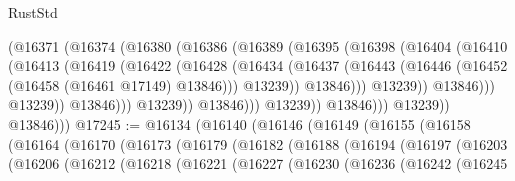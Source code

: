 \begin{lexlean}{RustStd}
\begin{coremodule}
                                (@16371
                                  (@16374
                                    (@16380
                                      (@16386
                                        (@16389
                                          (@16395
                                            (@16398
                                              (@16404
                                                (@16410
                                                  (@16413
                                                    (@16419
                                                      (@16422
                                                        (@16428
                                                          (@16434
                                                            (@16437
                                                              (@16443
                                                                (@16446
                                                                  (@16452
                                                                    (@16458
                                                                      (@16461 @17149)
                                                                      @13846)))
                                                                @13239))
                                                            @13846)))
                                                      @13239))
                                                  @13846)))
                                            @13239))
                                        @13846)))
                                  @13239))
                              @13846)))
                        @13239))
                    @13846)))
              @13239))
          @13846)))
@17245 := @16134
    (@16140
      (@16146
        (@16149
          (@16155
            (@16158
              (@16164
                (@16170
                  (@16173
                    (@16179
                      (@16182
                        (@16188
                          (@16194
                            (@16197
                              (@16203
                                (@16206
                                  (@16212
                                    (@16218
                                      (@16221
                                        (@16227
                                          (@16230
                                            (@16236
                                              (@16242
                                                (@16245

\end{coremodule}
\end{lexlean}
